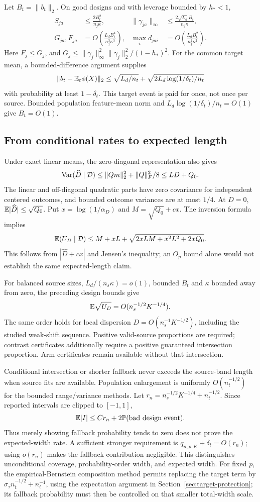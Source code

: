 Let $B_t=\|b_t\|_2$. On good designs and with leverage bounded by $h_*<1$,
\begin{align*}
 S_{ja}&\le\frac{2B_t^2}{n_j\kappa},&
 \|\gamma_{ja}\|_\infty&\le\frac{2\sqrt{L_d}B_t}{n_j\kappa},\\
 G_{ja},F_{ja}&=O\!\left(\frac{L_dB_t^4}{n_j^3\kappa^3}\right),&
 \max_i d_{jai}&=O\!\left(\frac{L_dB_t^2}{n_j^2\kappa^2}\right).
\end{align*}
Here $F_j\le G_j$, and
$G_j\le\|\gamma_j\|_\infty^2\|\gamma_j\|_2^2/(1-h_*)^2$.
For the common target mean, a bounded-difference argument supplies
\[
 \|b_t-\mathbb E_t\phi(X)\|_2
 \le \sqrt{L_d/n_t}+\sqrt{2L_d\log(1/\delta_t)/n_t}
\]
with probability at least $1-\delta_t$. This target event is paid for once,
not once per source. Bounded population feature-mean norm and
$L_d\log(1/\delta_t)/n_t=O(1)$ give $B_t=O(1)$.

\subsection{From conditional rates to expected length}

Under exact linear means, the zero-diagonal representation also gives
\[
 \operatorname{Var}(\widehat D\mid\mathcal D)
 \le\|Qm\|_2^2+\|Q\|_F^2/8\le LD+Q_0.
\]
The linear and off-diagonal quadratic parts have zero covariance for independent
centered outcomes, and bounded outcome variances are at most $1/4$.
At $D=0$, $\mathbb E|\widehat D|\le\sqrt{Q_0}$. Put $x=\log(1/\alpha_D)$ and
$M=\sqrt{Q_0}+cx$. The inversion formula implies
\[
 \mathbb E(U_D\mid\mathcal D)
 \le M+xL+\sqrt{2xLM+x^2L^2+2xQ_0}.
\]
This follows from $|\widehat D+cx|$ and Jensen's inequality; an $O_p$ bound
alone would not establish the same expected-length claim.

For balanced source sizes, $L_d/(n_s\kappa)=o(1)$, bounded $B_t$ and
$\kappa$ bounded away from zero, the preceding design bounds give
\[
 \mathbb E\sqrt{U_D}=O(n_s^{-1/2}K^{-1/4}).
\]
The same order holds for local dispersion $D=O(n_s^{-1}K^{-1/2})$,
including the studied weak-shift sequence. Positive valid-source proportions
are required; contrast certificates additionally require a positive guaranteed
intersection proportion. Arm certificates remain available without that
intersection.

Conditional intersection or shorter fallback never exceeds the source-band
length when source fits are available. Population enlargement is uniformly
$O(n_t^{-1/2})$ for the bounded range/variance methods. Let
$r_n=n_s^{-1/2}K^{-1/4}+n_t^{-1/2}$. Since reported intervals are clipped to
$[-1,1]$,
\[
 \mathbb E|I|\le C r_n+2\mathbb P(\hbox{bad design event}).
\]
Thus merely showing fallback probability tends to zero does not prove the
expected-width rate. A sufficient stronger requirement is
$q_{n,p,K}+\delta_t=O(r_n)$; using $o(r_n)$ makes the fallback contribution
negligible. This distinguishes unconditional coverage, probability-order width,
and expected width. For fixed $p$, the empirical-Bernstein composition method
permits replacing the target term by
$\sigma_\tau n_t^{-1/2}+n_t^{-1}$, using the expectation argument in
Section~\ref{sec:target-protection}; its fallback probability must then be
controlled on that smaller total-width scale.

